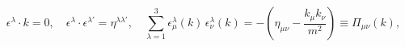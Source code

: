 \begin{equation}
\epsilon^{\lambda}\cdot
k=0,\quad\epsilon^{\lambda}\cdot\epsilon^{\lambda'}=\eta^{\lambda\lambda'}
,\quad\sum_{\lambda=1}^{3}\epsilon_{\mu}^{\lambda}(k)\,\epsilon_{\nu}^{\lambda}(k)=-\left(\eta_{\mu\nu}-\frac{
k_{\mu}k_{\nu}}{m^{2}}\right)\equiv \Pi_{\mu\nu}(k),
\end{equation}

